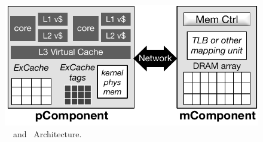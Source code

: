 {
\begin{figure}[th]
\begin{minipage}{\figWidth}
\begin{center}
\centerline{\includegraphics[width=5in]{lego/Figures/hwarch.pdf}}
\caption[\lego\ \pcomponent\ and \mcomponent\ Architecture.]{\lego\ \pcomponent\ and \mcomponent\ Architecture.}
\label{fig-lego-hw-arch}
\end{center}
\end{minipage}
\end{figure}
}
